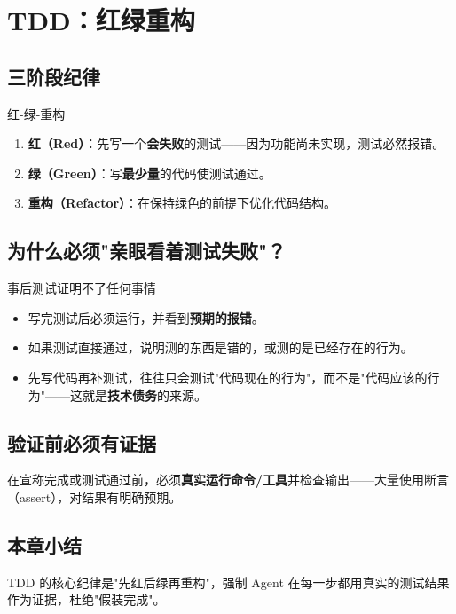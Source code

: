 \section{TDD：红绿重构}

\subsection{三阶段纪律}

\begin{importantbox}{红-绿-重构}
\begin{enumerate}
    \item \textbf{红（Red）}：先写一个\textbf{会失败}的测试——因为功能尚未实现，测试必然报错。
    \item \textbf{绿（Green）}：写\textbf{最少量}的代码使测试通过。
    \item \textbf{重构（Refactor）}：在保持绿色的前提下优化代码结构。
\end{enumerate}
\end{importantbox}

\subsection{为什么必须"亲眼看着测试失败"？}

\begin{warningbox}{事后测试证明不了任何事情}
\begin{itemize}
    \item 写完测试后必须运行，并看到\textbf{预期的报错}。
    \item 如果测试直接通过，说明测的东西是错的，或测的是已经存在的行为。
    \item 先写代码再补测试，往往只会测试"代码现在的行为"，而不是"代码应该的行为"——这就是\textbf{技术债务}的来源。
\end{itemize}
\end{warningbox}

\subsection{验证前必须有证据}

在宣称完成或测试通过前，必须\textbf{真实运行命令/工具}并检查输出——大量使用断言（assert），对结果有明确预期。

\subsection{本章小结}

TDD 的核心纪律是"先红后绿再重构"，强制 Agent 在每一步都用真实的测试结果作为证据，杜绝"假装完成"。


